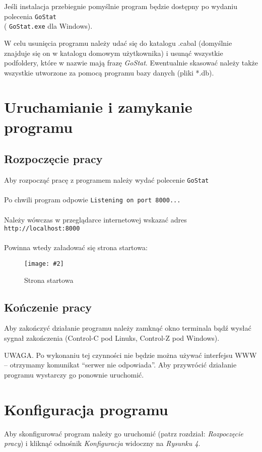 \documentclass[10pt,leqno]{article}
\newcommand{\myimage}[3]{
  \begin{figure}[h!]
    \centering
      \texttt{[image: \#2]}
  \caption{#3}
  \end{figure}
}
\newcommand{\cmd}[1]{
  \texttt{#1}
}
\begin{document}
Jeśli instalacja przebiegnie pomyślnie program będzie dostępny po wydaniu polecenia \cmd{GoStat} \\
(\cmd{GoStat.exe} dla Windows).

W celu usunięcia programu należy udać się do katalogu .cabal (domyślnie znajduje się on w katalogu domowym użytkownika) i usunąć wszystkie
podfoldery, które w nazwie mają frazę \emph{GoStat}. Ewentualnie skasować należy także wszystkie utworzone za pomocą programu bazy danych (pliki *.db).

\newpage

\section{Uruchamianie i zamykanie programu}

\subsection{Rozpoczęcie pracy}
Aby rozpocząć pracę z programem należy wydać polecenie \cmd{GoStat} \\ 
\\
Po chwili program odpowie \cmd{Listening on port 8000...} \\
\\
Należy wówczas w przeglądarce internetowej wskazać adres \cmd{http://localhost:8000} \\
\\
Powinna wtedy załadować się strona startowa:

\myimage{0.4}{start.png}{Strona startowa}

\subsection{Kończenie pracy}
Aby zakończyć działanie programu należy zamknąć okno terminala bądź wysłać sygnał zakończenia (Control-C pod Linuks, Control-Z pod Windows).

UWAGA. Po wykonaniu tej czynności nie będzie można używać interfejsu WWW -- otrzymamy komunikat ``serwer nie odpowiada''. Aby przywrócić działanie programu
wystarczy go ponownie uruchomić.


\newpage

\section{Konfiguracja programu}
Aby skonfigurować program należy go uruchomić (patrz rozdział: \emph{Rozpoczęcie pracy}) i kliknąć odnośnik \emph{Konfiguracja} 
widoczny na \emph{Rysunku 4}.
\end{document}
